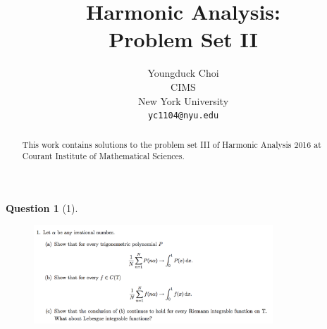 \documentclass{article} %
\title{Harmonic Analysis:  \\
Problem Set II}
\author{
Youngduck Choi \\
CIMS \\
New York University\\
\texttt{yc1104@nyu.edu} \\
}
\theoremstyle{quest}
\newtheorem*{question}{Question}
\begin{document}
\maketitle

\begin{abstract}
This work contains solutions to the problem set III
of Harmonic Analysis 2016 at Courant Institute of Mathematical Sciences.
\end{abstract}

\begin{question}[1]
\hfill
\begin{figure}[h!]
  \centering
    \includegraphics[width=0.8\textwidth]{HA-3-1.png}
\end{figure}
\end{question}
\end{document}
